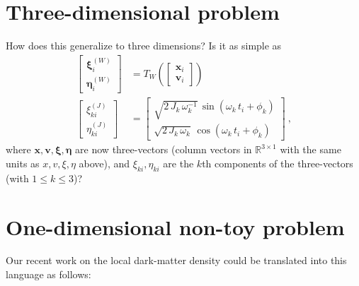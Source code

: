 \documentclass{article}
\begin{document}
\section{Three-dimensional problem}
How does this generalize to three dimensions?
Is it as simple as
\begin{align}
    \begin{bmatrix}\boldsymbol{\xi}^{(W)}_i \\ \boldsymbol{\eta}^{(W)}_i\end{bmatrix} &= T_W(\begin{bmatrix}\boldsymbol{x}_i \\ \boldsymbol{v}_i\end{bmatrix}) \\
    \begin{bmatrix}\xi^{(J)}_{ki} \\ \eta^{(J)}_{ki}\end{bmatrix} &= \begin{bmatrix}\sqrt{2\,J_k\,\omega_k^{-1}}\,\sin(\omega_k\,t_i+\phi_k) \\ \sqrt{2\,J_k\,\omega_k}\,\cos(\omega_k\,t_i+\phi_k)\end{bmatrix} ~,
\end{align}
where $\boldsymbol{x}, \boldsymbol{v}, \boldsymbol{\xi}, \boldsymbol{\eta}$ are now three-vectors (column vectors in $\mathbb{R}^{3\times 1}$ with the same units as $x, v, \xi, \eta$ above),
and $\xi_{ki}, \eta_{ki}$ are the $k$th components of the three-vectors (with $1\leq k\leq 3$)?

\section{One-dimensional non-toy problem}
Our recent work on the local dark-matter density \cite{horta} could be translated into this language as follows:
\end{document}
